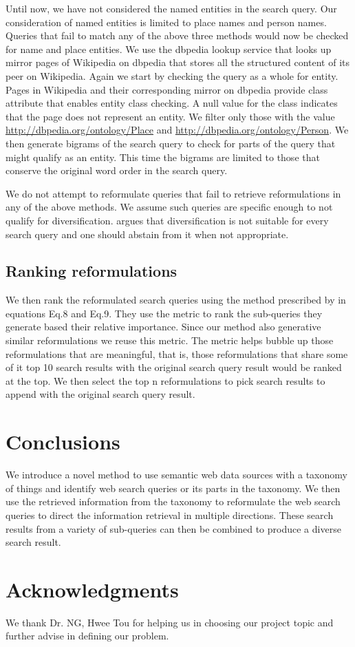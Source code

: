 \documentclass[11pt]{article}
\begin{document}
Until now, we have not considered the named entities in the search query. Our consideration of 
named entities is limited to place names and person names. Queries that fail to match any of the above three 
methods would now be checked for name and place entities. We use the dbpedia lookup service \cite{dbpedia:lookup} 
that looks up mirror pages of Wikipedia on dbpedia that stores all the structured content of its peer on Wikipedia.
Again we start by checking the query as a whole for entity. Pages in Wikipedia and their corresponding 
mirror on dbpedia provide class attribute that enables entity class checking. A null value for the class indicates that the page 
does not represent an entity. We filter only those with the value \url{http://dbpedia.org/ontology/Place}
and \url{http://dbpedia.org/ontology/Person}. We then generate bigrams of the search query to check for 
parts of the query that might qualify as an entity. This time the bigrams are limited to those that 
conserve the original word order in the search query. 

We do not attempt to reformulate queries that fail to retrieve reformulations in any of the above methods.
We assume such queries are specific enough to not qualify for diversification. \cite{santos2010selectively} 
argues that  diversification is not suitable for every search query and one should abstain from it when 
not appropriate.


\subsection{Ranking reformulations}
\label{ss:ranking}
We then rank the reformulated search queries using the method prescribed by 
\cite{santos2010exploiting} in equations Eq.8 and Eq.9. They use the metric 
to rank the sub-queries they generate based their relative importance. Since 
our method also generative similar reformulations we reuse this metric.
The metric helps bubble up those reformulations that are meaningful, that is, 
those reformulations that share some of it top 10 search results with the 
original search query result would be ranked at the top. We then select the 
top n reformulations to pick search results to append with the original search 
query result.

\section {Conclusions}
We introduce a novel method to use semantic web data sources with a  
taxonomy of things and identify web search queries or its parts 
in the taxonomy. We then use the retrieved information from the 
taxonomy to reformulate the web search queries to direct the 
information retrieval in multiple directions. These search results 
from a variety of sub-queries can then be combined to produce a 
diverse search result. 

\section*{Acknowledgments}
We thank Dr. NG, Hwee Tou for helping us in choosing our project 
topic and further advise in defining our problem.




\end{document}
